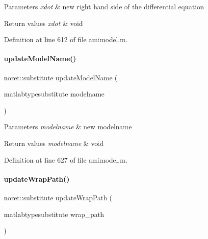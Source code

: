 \begin{DoxyParams}{Parameters}
{\em xdot} & new right hand side of the differential equation\\
\hline
\end{DoxyParams}

\begin{DoxyRetVals}{Return values}
{\em xdot} & void \\
\hline
\end{DoxyRetVals}


Definition at line 612 of file amimodel.\+m.

\mbox{\label{classamimodel_a5692662c7851369abd5ca0e51295f33a}} 
\paragraph{\texorpdfstring{update\+Model\+Name()}{updateModelName()}}
{\footnotesize\ttfamily noret\+::substitute update\+Model\+Name (\begin{DoxyParamCaption}\item[{matlabtypesubstitute}]{modelname }\end{DoxyParamCaption})}


\begin{DoxyParams}{Parameters}
{\em modelname} & new modelname\\
\hline
\end{DoxyParams}

\begin{DoxyRetVals}{Return values}
{\em modelname} & void \\
\hline
\end{DoxyRetVals}


Definition at line 627 of file amimodel.\+m.

\mbox{\label{classamimodel_a802e66e0a311bd894de30058b7bf028a}} 
\paragraph{\texorpdfstring{update\+Wrap\+Path()}{updateWrapPath()}}
{\footnotesize\ttfamily noret\+::substitute update\+Wrap\+Path (\begin{DoxyParamCaption}\item[{matlabtypesubstitute}]{wrap\+\_\+path }\end{DoxyParamCaption})}


